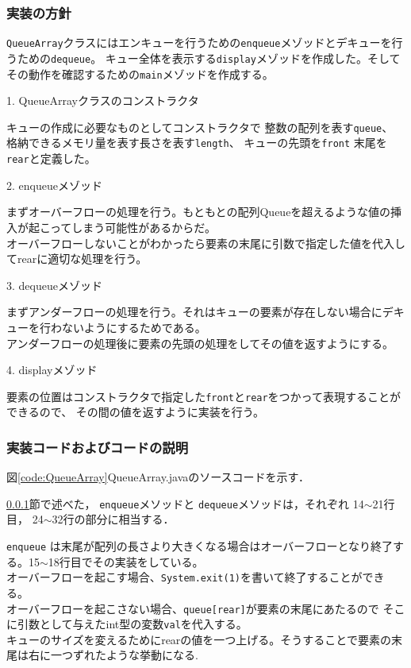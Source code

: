 \documentclass[10.5pt,a4paper]{jsarticle}
\newcommand{\figref}[1]{図\ref{#1}}
\newcommand{\secref}[1]{\ref{#1}節}
\begin{document}
\subsubsection{実装の方針}\label{sec:bs_impl_policy}
\texttt{QueueArray}クラスにはエンキューを行うための\texttt{enqueue}メゾッドとデキューを行うための\texttt{dequeue}。
キュー全体を表示する\texttt{display}メゾッドを作成した。そしてその動作を確認するための\texttt{main}メゾッドを作成する。

1. QueueArrayクラスのコンストラクタ

キューの作成に必要なものとしてコンストラクタで
整数の配列を表す\texttt{queue}、
格納できるメモリ量を表す長さを表す\texttt{length}、
キューの先頭を\texttt{front}
末尾を\texttt{rear}と定義した。

2. enqueueメゾッド

まずオーバーフローの処理を行う。もともとの配列Queueを超えるような値の挿入が起こってしまう可能性があるからだ。\\
オーバーフローしないことがわかったら要素の末尾に引数で指定した値を代入してrearに適切な処理を行う。

3. dequeueメゾッド

まずアンダーフローの処理を行う。それはキューの要素が存在しない場合にデキューを行わないようにするためである。\\
アンダーフローの処理後に要素の先頭の処理をしてその値を返すようにする。

4. displayメゾッド

要素の位置はコンストラクタで指定した\texttt{front}と\texttt{rear}をつかって表現することができるので、
その間の値を返すように実装を行う。

\subsubsection{実装コードおよびコードの説明}

\figref{code:QueueArray}QueueArray.javaのソースコードを示す．

\secref{sec:bs_impl_policy}で述べた，
\texttt{enqueue}メソッドと
\texttt{dequeue}メソッドは，それぞれ
14$\sim$21行目，
24$\sim$32行の部分に相当する．

\texttt{enqueue}
は末尾が配列の長さより大きくなる場合はオーバーフローとなり終了する。15$\sim$18行目でその実装をしている。\\
オーバーフローを起こす場合、\texttt{System.exit(1)}を書いて終了することができる。\\
オーバーフローを起こさない場合、\texttt{queue[rear]}が要素の末尾にあたるので
そこに引数として与えたint型の変数\texttt{val}を代入する。\\
キューのサイズを変えるためにrearの値を一つ上げる。そうすることで要素の末尾は右に一つずれたような挙動になる.
\end{document}
